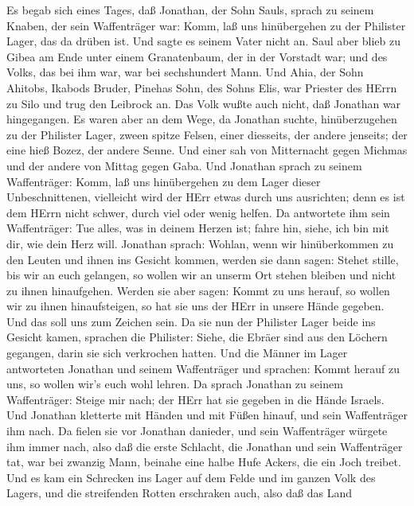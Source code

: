  Es begab sich eines Tages, daß Jonathan, der Sohn Sauls,
sprach zu seinem Knaben, der sein Waffenträger war: Komm, laß uns
hinübergehen zu der Philister Lager, das da drüben ist. Und sagte es
seinem Vater nicht an.  Saul aber blieb zu Gibea am Ende
unter einem Granatenbaum, der in der Vorstadt war; und des Volks, das
bei ihm war, war bei sechshundert Mann.  Und Ahia, der Sohn
Ahitobs, Ikabods Bruder, Pinehas Sohn, des Sohns Elis, war Priester des
HErrn zu Silo und trug den Leibrock an. Das Volk wußte auch nicht, daß
Jonathan war hingegangen.  Es waren aber an dem Wege, da
Jonathan suchte, hinüberzugehen zu der Philister Lager, zween spitze
Felsen, einer diesseits, der andere jenseits; der eine hieß Bozez, der
andere Senne.  Und einer sah von Mitternacht gegen Michmas
und der andere von Mittag gegen Gaba.  Und Jonathan sprach
zu seinem Waffenträger: Komm, laß uns hinübergehen zu dem Lager dieser
Unbeschnittenen, vielleicht wird der HErr etwas durch uns ausrichten;
denn es ist dem HErrn nicht schwer, durch viel oder wenig helfen.
 Da antwortete ihm sein Waffenträger: Tue alles, was in
deinem Herzen ist; fahre hin, siehe, ich bin mit dir, wie dein Herz
will.  Jonathan sprach: Wohlan, wenn wir hinüberkommen zu
den Leuten und ihnen ins Gesicht kommen,  werden sie dann
sagen: Stehet stille, bis wir an euch gelangen, so wollen wir an unserm
Ort stehen bleiben und nicht zu ihnen hinaufgehen.  Werden
sie aber sagen: Kommt zu uns herauf, so wollen wir zu ihnen
hinaufsteigen, so hat sie uns der HErr in unsere Hände gegeben. Und das
soll uns zum Zeichen sein.  Da sie nun der Philister Lager
beide ins Gesicht kamen, sprachen die Philister: Siehe, die Ebräer sind
aus den Löchern gegangen, darin sie sich verkrochen hatten.
 Und die Männer im Lager antworteten Jonathan und seinem
Waffenträger und sprachen: Kommt herauf zu uns, so wollen wir's euch
wohl lehren. Da sprach Jonathan zu seinem Waffenträger: Steige mir nach;
der HErr hat sie gegeben in die Hände Israels.  Und
Jonathan kletterte mit Händen und mit Füßen hinauf, und sein
Waffenträger ihm nach. Da fielen sie vor Jonathan danieder, und sein
Waffenträger würgete ihm immer nach,  also daß die erste
Schlacht, die Jonathan und sein Waffenträger tat, war bei zwanzig Mann,
beinahe eine halbe Hufe Ackers, die ein Joch treibet.  Und
es kam ein Schrecken ins Lager auf dem Felde und im ganzen Volk des
Lagers, und die streifenden Rotten erschraken auch, also daß das Land
